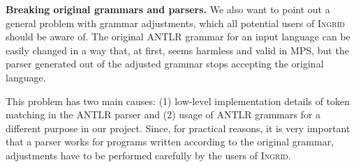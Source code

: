 \noindent\textbf{Breaking original grammars and parsers.}
We also want to point out a general problem with grammar adjustments, which all potential users of \textsc{Ingrid} should be aware of.
The original ANTLR grammar for an input language can be easily changed in a way that, at first, seems harmless and valid in MPS, but the parser generated out of the adjusted grammar stops accepting the original language.

This problem has two main causes: (1) low-level implementation details of token matching in the ANTLR parser and (2) usage of ANTLR grammars for a different purpose in our project.
Since, for practical reasons, it is very important that a parser works for programs written according to the original grammar, adjustments have to be performed carefully by the users of \textsc{Ingrid}.

